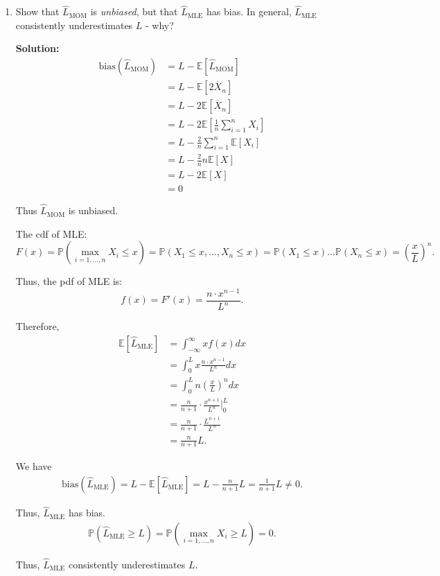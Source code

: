 \documentclass[letter, 12pt]{article}
\begin{document}
\begin{enumerate}[wide = 0pt, label = \arabic*)]
		\item {Show that $ \hat{L}_{\text{MOM}} $ is \textit{unbiased}, but that $ \hat{L}_{\text{MLE}} $ has bias. In general, $ \hat{L}_{\text{MLE}} $ consistently underestimates $ L $ - why?}
		\par{\textbf{Solution:}}
		\begin{align*}
			\text{bias}(\hat{L}_{\text{MOM}}) &= L - \mathbb{E}[\hat{L}_{\text{MOM}}] \\
			&= L - \mathbb{E}[2 \overline{X}_n] \\
			&= L - 2 \mathbb{E}[\overline{X}_n] \\
			&= L - 2 \mathbb{E}[\frac{1}{n}\sum_{i=1}^{n}{X}_i] \\
			&= L - \frac{2}{n} \sum_{i=1}^{n} \mathbb{E}[{X}_i] \\
			&= L - \frac{2}{n} n \mathbb{E}[X] \\
			&= L - 2 \mathbb{E}[X] \\
			&= 0
		\end{align*}
		\par{Thus $ \hat{L}_{\text{MOM}} $ is unbiased.}
		\par{The cdf of MLE: }
		\begin{equation*}
			F(x) = \mathbb{P}(\max_{i=1,\dots,n} X_i \le x) = \mathbb{P}(X_1 \le x, \dots, X_n \le x) = \mathbb{P}(X_1 \le x)\dots\mathbb{P}(X_n \le x) = (\frac{x}{L})^n .
		\end{equation*}
		\par{Thus, the pdf of MLE is:}
		\begin{equation*}
			f(x) = F'(x) = \frac{n \cdot x^{n-1}}{L^n} .
		\end{equation*}
		\par{Therefore, }
		\begin{align*}
			\mathbb{E}[\hat{L}_{\text{MLE}}] &= \int_{-\infty}^{\infty} x f(x) dx \\
			&= \int_{0}^{L} x \frac{n \cdot x^{n-1}}{L^n} dx \\
			&= \int_{0}^{L} n (\frac{x}{L})^n dx \\
			&= \frac{n}{n+1} \cdot \frac{x^{n+1}}{L^n} \Big|_0^L \\
			&= \frac{n}{n+1} \cdot \frac{L^{n+1}}{L^n} \\
			&= \frac{n}{n+1} L . 
		\end{align*}
		\par{We have}
		\begin{align*}
			\text{bias}(\hat{L}_{\text{MLE}}) = L - \mathbb{E}[\hat{L}_{\text{MLE}}] 
			= L - \frac{n}{n+1} L 
			= \frac{1}{n+1} L 
			 \ne 0.
		\end{align*}
		\par{Thus, $ \hat{L}_{\text{MLE}} $ has bias.}
		\begin{align*}
			\mathbb{P}(\hat{L}_{\text{MLE}} \ge L) = \mathbb{P}(\max_{i=1,\dots,n} X_i \ge L) = 0.
		\end{align*}
		\par{Thus, $ \hat{L}_{\text{MLE}} $ consistently underestimates $ L $.}
		

\end{enumerate}
\end{document}

